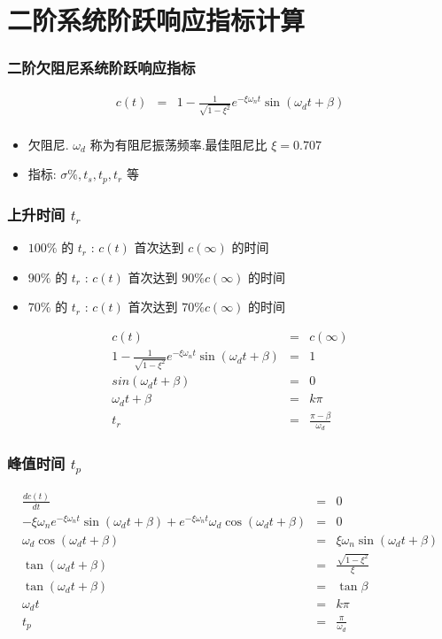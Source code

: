 \documentclass{beamer}
\begin{document}
\section{二阶系统阶跃响应指标计算}
\label{sec-3}
\begin{frame}
\frametitle{二阶欠阻尼系统阶跃响应指标}
\label{sec-3-1}


\begin{eqnarray*}
   c(t)  &=& 1-\frac{1}{\sqrt{1-\xi^2}}e^{-\xi\omega_n t}\sin(\omega_d t+\beta)\\
\end{eqnarray*}

\begin{itemize}
\item 欠阻尼. $\omega_d$ 称为有阻尼振荡频率.最佳阻尼比 $\xi=0.707$
\item 指标: $\sigma\% , t_s , t_p , t_r$ 等
\end{itemize}
\end{frame}
\begin{frame}
\frametitle{上升时间 $t_r$}
\label{sec-3-2}

\begin{itemize}
\item $100\%$ 的 $t_r$ : $c(t)$ 首次达到 $c(\infty)$ 的时间
\item $90\%$ 的 $t_r$ : $c(t)$ 首次达到 $90\%c(\infty)$ 的时间
\item $70\%$ 的 $t_r$ : $c(t)$ 首次达到 $70\%c(\infty)$ 的时间
\end{itemize}

\begin{eqnarray*}
c(t) & = & c(\infty) \\
1-\frac{1}{\sqrt{1-\xi^2}}e^{-\xi\omega_n t}\sin(\omega_d t+\beta) &=& 1 \\
sin(\omega_d t+\beta) &=& 0 \\
\omega_d t+\beta &=& k\pi \\
t_r &=& \frac{\pi-\beta}{\omega_d}
\end{eqnarray*}
\end{frame}
\begin{frame}
\frametitle{峰值时间 $t_p$}
\label{sec-3-3}



\begin{eqnarray*}
\frac{dc(t)}{dt} &=& 0 \\
-\xi\omega_n e^{-\xi\omega_n t}\sin(\omega_d t+\beta)+e^{-\xi\omega_n t}\omega_d\cos(\omega_d t+\beta) & = & 0 \\
\omega_d\cos(\omega_d t+\beta) &=& \xi\omega_n \sin(\omega_d t+\beta) \\
\tan(\omega_d t+\beta) &=& \frac{\sqrt{1-\xi^2}}{\xi} \\
\tan(\omega_d t+\beta) &=& \tan\beta \\
\omega_d t &=& k\pi\\
t_p &=& \frac{\pi}{\omega_d}
\end{eqnarray*}
\end{frame}
\end{document}
